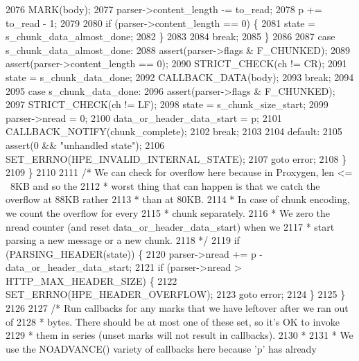 \begin{DoxyCode}
2076         MARK(body);
2077         parser->content_length -= to\_read;
2078         p += to\_read - 1;
2079 
2080         \textcolor{keywordflow}{if} (parser->content_length == 0) \{
2081           state = s_chunk_data_almost_done;
2082         \}
2083 
2084         \textcolor{keywordflow}{break};
2085       \}
2086 
2087       \textcolor{keywordflow}{case} s_chunk_data_almost_done:
2088         assert(parser->flags & F_CHUNKED);
2089         assert(parser->content_length == 0);
2090         STRICT_CHECK(ch != CR);
2091         state = s_chunk_data_done;
2092         CALLBACK_DATA(body);
2093         \textcolor{keywordflow}{break};
2094 
2095       \textcolor{keywordflow}{case} s_chunk_data_done:
2096         assert(parser->flags & F_CHUNKED);
2097         STRICT_CHECK(ch != LF);
2098         state = s_chunk_size_start;
2099         parser->nread = 0;
2100         data\_or\_header\_data\_start = p;
2101         CALLBACK_NOTIFY(chunk\_complete);
2102         \textcolor{keywordflow}{break};
2103 
2104       \textcolor{keywordflow}{default}:
2105         assert(0 && \textcolor{stringliteral}{"unhandled state"});
2106         SET_ERRNO(HPE_INVALID_INTERNAL_STATE);
2107         \textcolor{keywordflow}{goto} error;
2108     \}
2109   \}
2110 
2111   \textcolor{comment}{/* We can check for overflow here because in Proxygen, len <= ~8KB and so the}
2112 \textcolor{comment}{   * worst thing that can happen is that we catch the overflow at 88KB rather}
2113 \textcolor{comment}{   * than at 80KB.}
2114 \textcolor{comment}{   * In case of chunk encoding, we count the overflow for every}
2115 \textcolor{comment}{   * chunk separately.}
2116 \textcolor{comment}{   * We zero the nread counter (and reset data\_or\_header\_data\_start) when we}
2117 \textcolor{comment}{   * start parsing a new message or a new chunk.}
2118 \textcolor{comment}{   */}
2119   \textcolor{keywordflow}{if} (PARSING_HEADER(state)) \{
2120     parser->nread += p - data\_or\_header\_data\_start;
2121     \textcolor{keywordflow}{if} (parser->nread > HTTP_MAX_HEADER_SIZE) \{
2122       SET_ERRNO(HPE_HEADER_OVERFLOW);
2123       \textcolor{keywordflow}{goto} error;
2124     \}
2125   \}
2126 
2127   \textcolor{comment}{/* Run callbacks for any marks that we have leftover after we ran out of}
2128 \textcolor{comment}{   * bytes. There should be at most one of these set, so it's OK to invoke}
2129 \textcolor{comment}{   * them in series (unset marks will not result in callbacks).}
2130 \textcolor{comment}{   *}
2131 \textcolor{comment}{   * We use the NOADVANCE() variety of callbacks here because 'p' has already}

\end{DoxyCode}
